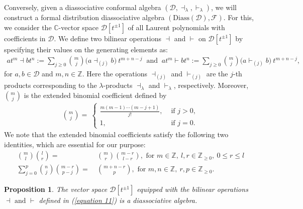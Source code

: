 \documentclass[a4paper,reqno,10pt]{amsart}
\theoremstyle{plain}
\newtheorem{proposition}[thm]{Proposition}
\theoremstyle{definition}
\theoremstyle{remark}
\newcommand{\Z}{\mathbb{Z}}
\newcommand{\C}{\mathbb{C}}
\newcommand{\D}{\mathcal{D}}
\newcommand{\la}{\lambda}
\begin{document}
Conversely, given a diassociative conformal algebra $(\D, \dashv_\la, \vdash_\la)$, we will construct a formal distribution diassociative algebra $( \mathrm{Diass} (\D), \mathcal{F})$. For this, we consider the $\C$-vector space $ \D[t^{\pm 1}]$ of all Laurent polynomials with coefficients in $\D$. We define two bilinear operations $\dashv$ and $\vdash$ on $\D[t^{\pm1}]$ by specifying their values on the generating elements as:
\begin{align} \label{equation 11} 
    at^{m} \dashv bt^{n} := \sum_{j \geq 0 } \binom{m}{j}  \big(a \dashv_{(j)} b \big) ~ \! t^{m+n-j }~ \text{ and }~  at^{m} \vdash bt^{n} := \sum_{j \geq 0 } \binom{m}{j} \big(a \vdash_{(j)} b \big) ~ \! t^{m+n-j }, 
\end{align}
for $ a, b \in \D$ and $ m,n \in \mathbb{Z} $. Here the operations $\dashv_{(j)}$ and $\vdash_{(j)}$ are the $j$-th products corresponding to the $\la$-products $\dashv_\la$ and $\vdash_\la$, respectively. Moreover, $\binom{m}{j}$ is the extended binomial coefficient defined by
\begin{align*}
    \binom{m}{j} = ~
    \begin{cases}
        \frac{m(m-1) \cdots (m-j+1)}{j!}, & \text{ if } j > 0,\\
        1, & \text { if } j= 0.
    \end{cases}
\end{align*}
We note that the extended binomial coefficients satisfy the following two identities, which are essential for our purpose:
\begin{align}
    \binom{m}{l} \binom{l}{r} =~& \binom{m}{r} \binom{m-r}{l-r}, \text{ for }m \in \Z,\ l,r \in \mathbb{Z}_{\geq 0},\ 0 \leq r \leq l \label{f-1}\\
    \sum_{j=0}^{p}
\binom{n}{j}
\binom{m-r}{p-j}
=~&
\binom{m+n-r}{p},\text{ for }m,n \in \Z, \ r, p \in \mathbb{Z}_{\geq 0}. \label{f-2}
\end{align}
\begin{proposition}\label{di-al}
    The vector space $\D[t^{\pm 1} ]$ equipped with the bilinear operations $\dashv\text{ and }\vdash $ defined in {\rm (\ref{equation 11})} is a diassociative algebra.
\end{proposition}
\end{document}
